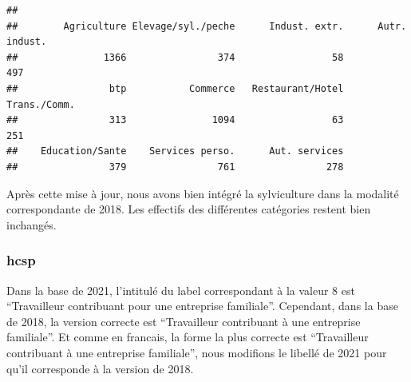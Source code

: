 \documentclass[
]{article}
\newenvironment{Shaded}{\begin{snugshade}}{\end{snugshade}}
\newcommand{\CommentTok}[1]{\textcolor[rgb]{0.56,0.35,0.01}{\textit{#1}}}
\newcommand{\FunctionTok}[1]{\textcolor[rgb]{0.13,0.29,0.53}{\textbf{#1}}}
\newcommand{\NormalTok}[1]{#1}
\newcommand{\OtherTok}[1]{\textcolor[rgb]{0.56,0.35,0.01}{#1}}
\newcommand{\SpecialCharTok}[1]{\textcolor[rgb]{0.81,0.36,0.00}{\textbf{#1}}}
\begin{document}
\begin{verbatim}
## 
##        Agriculture Elevage/syl./peche      Indust. extr.      Autr. indust. 
##               1366                374                 58                497 
##                btp           Commerce   Restaurant/Hotel       Trans./Comm. 
##                313               1094                 63                251 
##    Education/Sante    Services perso.      Aut. services 
##                379                761                278
\end{verbatim}

Après cette mise à jour, nous avons bien intégré la sylviculture dans la
modalité correspondante de 2018. Les effectifs des différentes
catégories restent bien inchangés.

\hypertarget{hcsp}{%
\subsubsection{hcsp}\label{hcsp}}

Dans la base de 2021, l'intitulé du label correspondant à la valeur 8
est ``Travailleur contribuant pour une entreprise familiale''.
Cependant, dans la base de 2018, la version correcte est ``Travailleur
contribuant à une entreprise familiale''. Et comme en francais, la forme
la plus correcte est ``Travailleur contribuant à une entreprise
familiale'', nous modifions le libellé de 2021 pour qu'il corresponde à
la version de 2018.

\begin{Shaded}
\end{Shaded}
\end{document}
